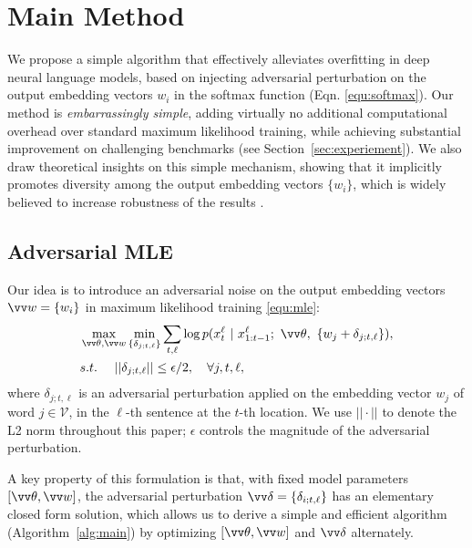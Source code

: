 \documentclass{article}
\begin{document}
\section{Main Method} \label{sec:main}
We propose a simple 
algorithm that 
effectively  
alleviates overfitting in deep neural language models, 
based on injecting adversarial perturbation on the output embedding vectors $w_i$ in  the softmax function (Eqn. \eqref{equ:softmax}).  
Our method is \emph{embarrassingly simple}, adding virtually no additional computational overhead over standard maximum likelihood training, 
while achieving substantial improvement on challenging benchmarks (see Section~\ref{sec:experiement}). 
We also draw theoretical insights on this simple mechanism,  
showing that it implicitly 
promotes diversity among the output embedding vectors $\{w_i\}$,
which is widely believed to increase robustness of the results \citep[e.g.,][]{cortes1995support, liu2018learning, gao2018representation}. 




\subsection{Adversarial MLE} 

Our idea is to introduce an adversarial noise on the output embedding vectors $\vv w = \{w_i\}$ in maximum likelihood training \eqref{equ:mle}: 
\begin{align}\label{equ:advsoft0}
\begin{split}
& \max_{\vv \theta,\vv w} \min_{\{\delta_{j;t,\ell}\}} \sum_{t,\ell} \log p(x_{t}^\ell ~|~ x_{1:t-1}^\ell; ~\vv\theta, ~\{ w_j+\delta_{j; t,\ell}\}), \\
& s.t. ~~~~ ||\delta_{j; t,\ell} ||\leq \epsilon/2, ~~~\forall j,t,\ell,
\end{split}
\end{align}
where $\delta_{j; t,\ell}$ is an adversarial perturbation applied on 
the embedding vector $w_j$ of word $j\in \mathcal V$, in the $\ell$-th sentence at the $t$-th location.  
We use $||\cdot||$ to denote the L2 norm throughout this paper; 
$\epsilon$ controls the magnitude of the adversarial perturbation.   




A key property of this formulation is that, with fixed model parameters $[\vv\theta,\vv w]$, 
the adversarial perturbation $\vv\delta = \{\delta_{i;t,\ell}\}$ has an elementary closed form solution, 
which allows us to derive a simple and efficient algorithm (Algorithm~\ref{alg:main}) by optimizing $[\vv\theta,\vv w]$ and $\vv\delta$ alternately. 
\end{document}
